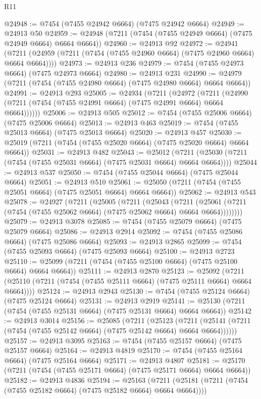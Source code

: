 \begin{lexlean}{R11}
\begin{coremodule}
@24948 := @7454 (@7455 @24942 @6664) (@7475 @24942 @6664)
@24949 := @24913 @50
@24959 := @24948 (@7211 (@7454 (@7455 @24949 @6664) (@7475 @24949 @6664) @6664 @6664))
@24960 := @24913 @92
@24972 := @24941
    (@7211 (@24959 (@7211 (@7454 (@7455 @24960 @6664) (@7475 @24960 @6664) @6664 @6664))))
@24973 := @24913 @236
@24979 := @7454 (@7455 @24973 @6664) (@7475 @24973 @6664)
@24980 := @24913 @231
@24990 := @24979 (@7211 (@7454 (@7455 @24980 @6664) (@7475 @24980 @6664) @6664 @6664))
@24991 := @24913 @293
@25005 := @24934
    (@7211
      (@24972
        (@7211 (@24990 (@7211 (@7454 (@7455 @24991 @6664) (@7475 @24991 @6664) @6664 @6664))))))
@25006 := @24913 @505
@25012 := @7454 (@7455 @25006 @6664) (@7475 @25006 @6664)
@25013 := @24913 @463
@25019 := @7454 (@7455 @25013 @6664) (@7475 @25013 @6664)
@25020 := @24913 @457
@25030 := @25019 (@7211 (@7454 (@7455 @25020 @6664) (@7475 @25020 @6664) @6664 @6664))
@25031 := @24913 @482
@25043 := @25012
    (@7211 (@25030 (@7211 (@7454 (@7455 @25031 @6664) (@7475 @25031 @6664) @6664 @6664))))
@25044 := @24913 @537
@25050 := @7454 (@7455 @25044 @6664) (@7475 @25044 @6664)
@25051 := @24913 @510
@25061 := @25050 (@7211 (@7454 (@7455 @25051 @6664) (@7475 @25051 @6664) @6664 @6664))
@25062 := @24913 @543
@25078 := @24927
    (@7211
      (@25005
        (@7211
          (@25043
            (@7211
              (@25061 (@7211 (@7454 (@7455 @25062 @6664) (@7475 @25062 @6664) @6664 @6664))))))))
@25079 := @24913 @3078
@25085 := @7454 (@7455 @25079 @6664) (@7475 @25079 @6664)
@25086 := @24913 @2914
@25092 := @7454 (@7455 @25086 @6664) (@7475 @25086 @6664)
@25093 := @24913 @2865
@25099 := @7454 (@7455 @25093 @6664) (@7475 @25093 @6664)
@25100 := @24913 @2723
@25110 := @25099 (@7211 (@7454 (@7455 @25100 @6664) (@7475 @25100 @6664) @6664 @6664))
@25111 := @24913 @2870
@25123 := @25092
    (@7211 (@25110 (@7211 (@7454 (@7455 @25111 @6664) (@7475 @25111 @6664) @6664 @6664))))
@25124 := @24913 @2943
@25130 := @7454 (@7455 @25124 @6664) (@7475 @25124 @6664)
@25131 := @24913 @2919
@25141 := @25130 (@7211 (@7454 (@7455 @25131 @6664) (@7475 @25131 @6664) @6664 @6664))
@25142 := @24913 @3014
@25156 := @25085
    (@7211
      (@25123
        (@7211 (@25141 (@7211 (@7454 (@7455 @25142 @6664) (@7475 @25142 @6664) @6664 @6664))))))
@25157 := @24913 @3095
@25163 := @7454 (@7455 @25157 @6664) (@7475 @25157 @6664)
@25164 := @24913 @4819
@25170 := @7454 (@7455 @25164 @6664) (@7475 @25164 @6664)
@25171 := @24913 @4807
@25181 := @25170 (@7211 (@7454 (@7455 @25171 @6664) (@7475 @25171 @6664) @6664 @6664))
@25182 := @24913 @4836
@25194 := @25163
    (@7211 (@25181 (@7211 (@7454 (@7455 @25182 @6664) (@7475 @25182 @6664) @6664 @6664))))

\end{coremodule}
\end{lexlean}
